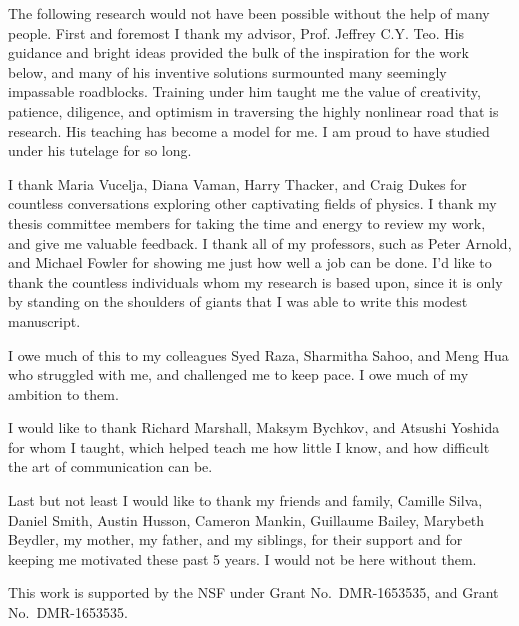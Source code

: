 \begin{acknowledgments}
The following research would not have been possible without the help of many people. First and foremost I thank my advisor, Prof. Jeffrey C.Y. Teo. His guidance and bright ideas provided the bulk of the inspiration for the work below, and many of his inventive solutions surmounted many seemingly impassable roadblocks. Training under him taught me the value of creativity, patience, diligence, and optimism in traversing the highly nonlinear road that is research. His teaching has become a model for me. I am proud to have studied under his tutelage for so long.

I thank Maria Vucelja, Diana Vaman, Harry Thacker, and Craig Dukes for countless conversations exploring other captivating fields of physics. I thank my thesis committee members for taking the time and energy to review my work, and give me valuable feedback. I thank all of my professors, such as Peter Arnold, and Michael Fowler for showing me just how well a job can be done. I'd like to thank the countless individuals whom my research is based upon, since it is only by standing on the shoulders of giants that I was able to write this modest manuscript.

I owe much of this to my colleagues Syed Raza, Sharmitha Sahoo, and Meng Hua who struggled with me, and challenged me to keep pace. I owe much of my ambition to them.

I would like to thank Richard Marshall, Maksym Bychkov, and Atsushi Yoshida for whom I taught, which helped teach me how little I know, and how difficult the art of communication can be.

Last but not least I would like to thank my friends and family, Camille Silva, Daniel Smith, Austin Husson, Cameron Mankin, Guillaume Bailey, Marybeth Beydler, my mother, my father, and my siblings, for their support and for keeping me motivated these past 5 years. I would not be here without them.
	
This work is supported by the NSF under Grant No.~DMR-1653535, and Grant No.~DMR-1653535. 

\end{acknowledgments}
